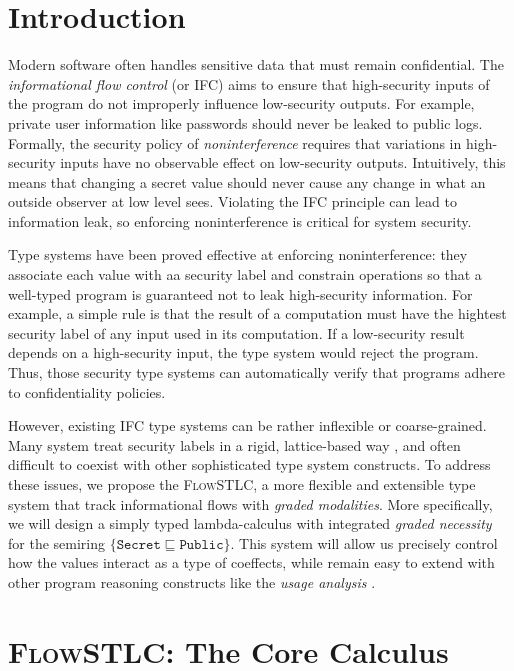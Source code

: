 \documentclass[conference]{IEEEtran}
\newcommand\public{\texttt{Public}}
\newcommand\secret{\texttt{Secret}}
\begin{document}
\section{Introduction}

Modern software often handles sensitive data that must remain confidential. The \emph{informational flow control} (or IFC) aims to ensure that high-security inputs of the program do not improperly influence low-security outputs. For example, private user information like passwords should never be leaked to public logs. Formally, the security policy of \emph{noninterference} requires that variations in high-security inputs have no observable effect on low-security outputs. Intuitively, this means that changing a secret value should never cause any change in what an outside observer at low level sees. Violating the IFC principle can lead to information leak, so enforcing noninterference is critical for system security.

Type systems \cite{sabelfeld2003language} have been proved effective at enforcing noninterference: they associate each value with aa security label and constrain operations so that a well-typed program is guaranteed not to leak high-security information. For example, a simple rule is that the result of a computation must have the hightest security label of any input used in its computation. If a low-security result depends on a high-security input, the type system would reject the program. Thus, those security type systems can automatically verify that programs adhere to confidentiality policies.

However, existing IFC type systems can be rather inflexible or coarse-grained. Many system treat security labels in a rigid, lattice-based way \cite{denning1976lattice}, and often difficult to coexist with other sophisticated type system constructs. To address these issues, we propose the \textsc{FlowSTLC}, a more flexible and extensible type system that track informational flows with \emph{graded modalities}. More specifically, we will design a simply typed lambda-calculus with integrated \emph{graded necessity} for the semiring $\{\secret\sqsubseteq\public\}$. This system will allow us precisely control how the values interact as a type of coeffects, while remain easy to extend with other program reasoning constructs like the \emph{usage analysis} \cite{orchard2019quantitative}.

\section{\textsc{FlowSTLC}: The Core Calculus}
\end{document}
